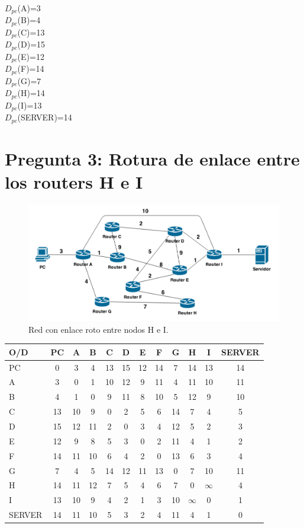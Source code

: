 \documentclass{article}
\begin{document}
{{{$D_{pc}$(A)=3\\
$D_{pc}$(B)=4\\
$D_{pc}$(C)=13\\
$D_{pc}$(D)=15\\
$D_{pc}$(E)=12\\
$D_{pc}$(F)=14\\
$D_{pc}$(G)=7\\
$D_{pc}$(H)=14\\
$D_{pc}$(I)=13\\
$D_{pc}$(SERVER)=14\\

\section{Pregunta 3: Rotura de enlace entre los routers H e I}

\begin{figure}[ht!]
\centering
\includegraphics[width=130mm]{mapaderedes.png}
\caption{Red con enlace roto entre nodos H e I.}
\label{overflow}
\end{figure}

\begin{tabular}{||l | c | c | c | c | c | c | c | c | c | c | c ||}
\hline
\hline
O/D & PC & A & B & C & D & E & F & G & H & I & SERVER \\
\hline
PC & 0 & 3 & 4 & 13 & 15 & 12 & 14 & 7 & 14 & 13 & 14 \\
\hline
A & 3 & 0 & 1 & 10 & 12 & 9 & 11 & 4 & 11 & 10 & 11 \\
\hline
B & 4 & 1 & 0 & 9 & 11 & 8 & 10 & 5 & 12 & 9 & 10 \\
\hline
C & 13 & 10 & 9 & 0 & 2 & 5 & 6 & 14 & 7 & 4 & 5 \\
\hline
D & 15 & 12 & 11 & 2 & 0 & 3 & 4 & 12 & 5 & 2 & 3 \\
\hline
E & 12 & 9 & 8 & 5 & 3 & 0 & 2 & 11 & 4 & 1 & 2 \\
\hline
F & 14 & 11 & 10 & 6 & 4 & 2 & 0 & 13 & 6 & 3 & 4 \\
\hline
G & 7 & 4 & 5 & 14 & 12 & 11 & 13 & 0 & 7 & 10 & 11 \\
\hline
H & 14 & 11 & 12 & 7 & 5 & 4 & 6 & 7 & 0 & $\infty$ & 4 \\
\hline
I & 13 & 10 & 9 & 4 & 2 & 1 & 3 & 10 & $\infty$ & 0 & 1 \\
\hline
SERVER & 14 & 11 & 10 & 5 & 3 & 2 & 4 & 11 & 4 & 1 & 0 \\
\hline
\end{tabular}\\\\

}}}
\end{document}
